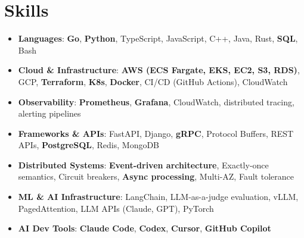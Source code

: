 \documentclass[letterpaper,11pt]{article}
\newcommand{\resumeSubHeadingListStart}{\begin{itemize}[leftmargin=0.15in, label={}]}
\newcommand{\resumeSubHeadingListEnd}{\end{itemize}}
\newcommand{\resumeSkillHeading}[2]{%
  \item\small{\textbf{#1}: #2 \vspace{-9pt}}%
}
\begin{document}
\section{Skills}
  \resumeSubHeadingListStart
    \resumeSkillHeading{Languages}{\textbf{Go}, \textbf{Python}, TypeScript, JavaScript, C++, Java, Rust, \textbf{SQL}, Bash}
    \resumeSkillHeading{Cloud \& Infrastructure}{\textbf{AWS (ECS Fargate, EKS, EC2, S3, RDS)}, GCP, \textbf{Terraform}, \textbf{K8s}, \textbf{Docker}, CI/CD (GitHub Actions), CloudWatch}
    \resumeSkillHeading{Observability}{\textbf{Prometheus}, \textbf{Grafana}, CloudWatch, distributed tracing, alerting pipelines}
    \resumeSkillHeading{Frameworks \& APIs}{FastAPI, Django, \textbf{gRPC}, Protocol Buffers, REST APIs, \textbf{PostgreSQL}, Redis, MongoDB}
    \resumeSkillHeading{Distributed Systems}{\textbf{Event-driven architecture}, Exactly-once semantics, Circuit breakers, \textbf{Async processing}, Multi-AZ, Fault tolerance}
    \resumeSkillHeading{ML \& AI Infrastructure}{LangChain, LLM-as-a-judge evaluation, vLLM, PagedAttention, LLM APIs (Claude, GPT), PyTorch}
    \resumeSkillHeading{AI Dev Tools}{\textbf{Claude Code}, \textbf{Codex}, \textbf{Cursor}, \textbf{GitHub Copilot}}
  \resumeSubHeadingListEnd
\end{document}
